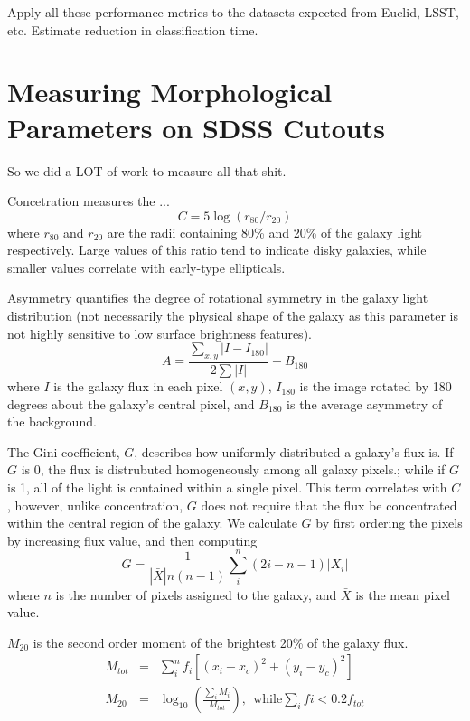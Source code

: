 \documentclass[twocolumn]{aastex6}
\newcommand{\rr}[1]{$r_{#1}$}
\newcommand{\M}[1]{$M_{#1}$}
\begin{document}
Apply all these performance metrics to the datasets expected from Euclid, LSST, etc. Estimate reduction in classification time. 








\appendix

\section{Measuring Morphological Parameters on SDSS Cutouts}
\label{sec:Appendix}

So we did a LOT of work to measure all that shit. 


Concetration measures the ... 
\begin{equation}
C = 5\log(r_{80}/ r_{20})
\end{equation}
where \rr{80} and \rr{20} are the radii containing 80\% and 20\% of the galaxy light respectively.  Large values of this ratio tend to indicate disky galaxies, while smaller values correlate with early-type ellipticals. 

Asymmetry quantifies the degree of rotational symmetry in the galaxy light distribution (not necessarily the physical shape of the galaxy as this parameter is not highly sensitive to low surface brightness features).  
\begin{equation}
A = \frac{\sum_{x,y} |I - I_{180}|}{ 2\sum|I|} - B_{180}
\end{equation}
where $I$ is the galaxy flux in each pixel $(x, y)$, $I_{180}$ is the image rotated by 180 degrees about the galaxy's central pixel, and $B_{180}$ is the average asymmetry of the background. 

The Gini coefficient, $G$, describes how uniformly distributed a galaxy's flux is.  If $G$ is 0, the flux is distrubuted homogeneously among all galaxy pixels.; while if $G$ is 1,  all of the light is contained within a single pixel. This term correlates with $C$, however, unlike concentration, $G$ does not require that the flux be concentrated within the central region of the galaxy.  We calculate $G$ by first ordering the pixels by increasing flux value, and then computing
\begin{equation}
G = \frac{1}{|\bar X|n(n-1)}\sum_i^n(2i-n-1)|X_i|
\end{equation}
where $n$ is the number of pixels assigned to the galaxy, and $\bar X$ is the mean pixel value. 

\M{20} is the second order moment of the brightest 20\% of the galaxy flux. 
\begin{eqnarray}
 M_{tot} & = & \sum_i^nf_i[(x_i-x_c)^2 + (y_i-y_c)^2]  \\
 M_{20} & = & \log_{10} (\frac{\sum_iM_i}{M_{tot}}), ~~\textrm{while} \sum_ifi < 0.2f_{tot}
\end{eqnarray}
\end{document}

